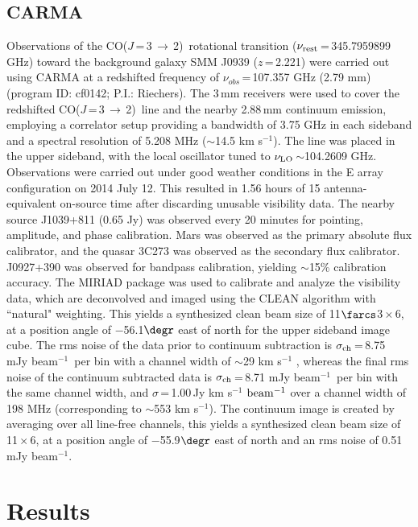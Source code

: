 \documentclass[twocolumn,apj,numberedappendix]{emulateapj}
\newcommand{\CO}{\mbox{CO($J$\,=\,3\,$\rightarrow$\,2) }}
\newcommand{\pmOne}{\mbox{$^{-1}$}}
\begin{document}
\subsection{CARMA} \label{sec:carmadata}
Observations of the \CO rotational transition ($\nu_{\rm rest}$\,=\,345.7959899 GHz) toward the background galaxy SMM
J0939 ($z$\,=\,2.221) were carried out using CARMA at a redshifted frequency of $\nu_{obs}$\,=\,107.357\,\,GHz (2.79\,\,mm)  (program ID: cf0142; P.I.: Riechers). The 3\,mm receivers were used to cover the redshifted \CO line and the nearby 2.88\,mm continuum emission, employing a correlator setup providing a bandwidth of 3.75 GHz in each sideband and a spectral resolution of 5.208 MHz ($\sim$14.5 km\,\,s\pmOne). The line was placed in the
upper sideband, with the local oscillator tuned to $\nu_{\rm LO}$\,$\sim$104.2609 GHz.
Observations were carried out under good
weather conditions in the E array configuration on 2014 July 12. This resulted in 1.56 hours of 15 antenna-equivalent on-source time after discarding unusable visibility data.
The nearby source J1039+811 (0.65\,\,Jy) was observed every 20 minutes for
pointing, amplitude, and phase calibration. Mars was observed as the primary
absolute flux calibrator, and the quasar 3C273 was observed as the secondary
flux calibrator. J0927+390 was observed for bandpass calibration, yielding $\sim
$15\% calibration accuracy.
The {\sc MIRIAD} package was used to calibrate and analyze the visibility data, which are deconvolved and imaged using
the CLEAN algorithm with ``natural" weighting. This yields a synthesized clean beam size of 11$\farcs$3\,$\times$\,6, at a position angle of $-$56.1$\degr$ east of north for the upper sideband image cube. 
The rms noise of the data prior to continuum subtraction is $\sigma_{\rm ch}$\,=\,8.75\,\,mJy\,\,beam\pmOne\ per bin 
with a channel width of $\sim$29 km\,\,s\pmOne
, whereas the final rms noise of the continuum subtracted data is $\sigma_{\rm ch}$\,=\,8.71\,\,mJy\,\,beam\pmOne\ per bin with 
the same channel width, and $\sigma$\,=\,1.00\,Jy\,\,km\,\,s\pmOne\,\,$\rm beam^{-1}$ over a channel 
width of 198 MHz (corresponding to $\sim$553\,\,km\,\,s\pmOne). 
The continuum image is created by
averaging over all line-free channels, this yields a synthesized clean beam size of 11\,$\times$\,6, at a position angle of $-$55.9$\degr$ east of north and an 
rms noise of 0.51\,\,mJy\,\,beam\pmOne.

\section{Results}\label{sec:res}
\end{document}
